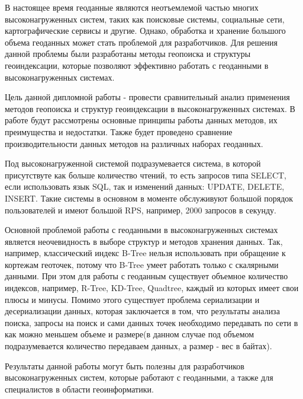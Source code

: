 \Introduction

В настоящее время геоданные являются неотъемлемой частью многих высоконагруженных систем, таких как поисковые системы, социальные сети, картографические сервисы и другие. Однако, обработка и хранение большого объема геоданных может стать проблемой для разработчиков. Для решения данной проблемы были разработаны методы геопоиска и структуры геоиндексации, которые позволяют эффективно работать с геоданными в высоконагруженных системах.

Цель данной дипломной работы - провести сравнительный анализ применения методов геопоиска и структур геоиндексации в высоконагруженных системах. В работе будут рассмотрены основные принципы работы данных методов, их преимущества и недостатки. Также будет проведено сравнение производительности данных методов на различных наборах геоданных.

Под высоконагруженной системой подразумевается система, в которой присутствуте как больше количество чтений, то есть запросов типа SELECT, если использовать язык SQL, так и изменений данных: UPDATE, DELETE, INSERT. Такие системы в основном в моменте обслуживуют большой порядок пользователей и имеют большой RPS, например, 2000 запросов в секунду.

Основной проблемой работы с геоданными в высоконагруженных системах является неочевидность в выборе структур и методов хранения данных. Так, например, классический индекс B-Tree нельзя использовать при обращение к кортежам геоточек, потому что B-Tree умеет работать только с скалярными данными. При этом для работы с геоданным существует объемное количество индексов, например, R-Tree, KD-Tree, Quadtree, каждый из которых имеет свои плюсы и минусы. Помимо этого существует проблема сериализации и десериализации данных, которая заключается в том, что результаты анализа поиска, запросы на поиск и сами данных точек необходимо передавать по сети в как можно меньшем объеме и размере(в данном случае под объемом подразумевается количество передаваем данных, а размер - вес в байтах).

Результаты данной работы могут быть полезны для разработчиков высоконагруженных систем, которые работают с геоданными, а также для специалистов в области геоинформатики.

